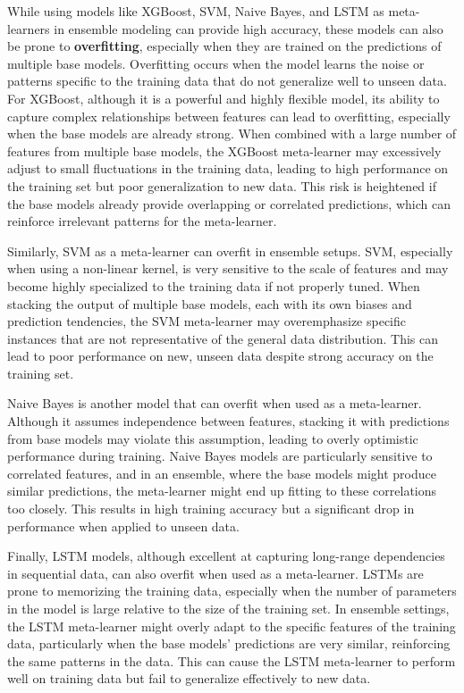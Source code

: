 \noindent
While using models like XGBoost, SVM, Naive Bayes, and LSTM as meta-learners in ensemble modeling can provide high accuracy, these models can also be prone to \textbf{overfitting}, especially when they are trained on the predictions of multiple base models. Overfitting occurs when the model learns the noise or patterns specific to the training data that do not generalize well to unseen data. For XGBoost, although it is a powerful and highly flexible model, its ability to capture complex relationships between features can lead to overfitting, especially when the base models are already strong. When combined with a large number of features from multiple base models, the XGBoost meta-learner may excessively adjust to small fluctuations in the training data, leading to high performance on the training set but poor generalization to new data. This risk is heightened if the base models already provide overlapping or correlated predictions, which can reinforce irrelevant patterns for the meta-learner.

\vspace{1em}

\noindent
Similarly, SVM as a meta-learner can overfit in ensemble setups. SVM, especially when using a non-linear kernel, is very sensitive to the scale of features and may become highly specialized to the training data if not properly tuned. When stacking the output of multiple base models, each with its own biases and prediction tendencies, the SVM meta-learner may overemphasize specific instances that are not representative of the general data distribution. This can lead to poor performance on new, unseen data despite strong accuracy on the training set.

\vspace{1em}

\noindent
Naive Bayes is another model that can overfit when used as a meta-learner. Although it assumes independence between features, stacking it with predictions from base models may violate this assumption, leading to overly optimistic performance during training. Naive Bayes models are particularly sensitive to correlated features, and in an ensemble, where the base models might produce similar predictions, the meta-learner might end up fitting to these correlations too closely. This results in high training accuracy but a significant drop in performance when applied to unseen data.

\vspace{1em}

\noindent
Finally, LSTM models, although excellent at capturing long-range dependencies in sequential data, can also overfit when used as a meta-learner. LSTMs are prone to memorizing the training data, especially when the number of parameters in the model is large relative to the size of the training set. In ensemble settings, the LSTM meta-learner might overly adapt to the specific features of the training data, particularly when the base models' predictions are very similar, reinforcing the same patterns in the data. This can cause the LSTM meta-learner to perform well on training data but fail to generalize effectively to new data.

